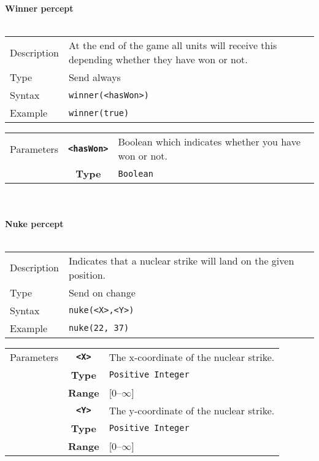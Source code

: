 \\\\
\noindent
\textbf{Winner percept}\\
\\
\begin{tabularx}{\textwidth}{lX}
 Description & At the end of the game all units will receive this depending whether they have won or not. \\
 Type & Send always \\
 Syntax &  \verb|winner(<hasWon>)| \\
 Example & \verb|winner(true)|   \\
 \end{tabularx}
 \begin{tabularx}{\textwidth}{l | c | p{8cm}|}
 \cline{2-3}
  Parameters & \textbf{\verb|<hasWon>|} & Boolean which indicates whether you have won or not. \\
             & \textbf{Type} & \verb|Boolean| \\
            \cline{2-3}
 \end{tabularx}
\\\\
\noindent
\textbf{Nuke percept}\\
\\
\begin{tabularx}{\textwidth}{lX}
 Description & Indicates that a nuclear strike will land on the given position. \\
 Type & Send on change \\
 Syntax & \verb|nuke(<X>,<Y>)| \\
 Example & \verb|nuke(22, 37)|   \\
 \end{tabularx}
 \begin{tabularx}{\textwidth}{l | c | p{8cm}|}
 \cline{2-3}
 Parameters & \textbf{\verb|<X>|} & The x-coordinate of the nuclear strike.\\
            & \textbf{Type} & \verb|Positive Integer| \\
            &\textbf{Range} &  [0--$\infty$] \\
            \cline{2-3}
            & \textbf{\verb|<Y>|} & The y-coordinate of the nuclear strike.\\
            & \textbf{Type} & \verb|Positive Integer| \\
            &\textbf{Range} & [0--$\infty$] \\
            \cline{2-3}
\end{tabularx}

